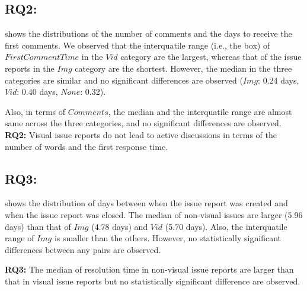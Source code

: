 \subsection*{RQ2: \RQtwo{}}


 shows the distributions of the number of comments and the days to receive the first comments. 
We observed that the interquatile range (i.e., the box) of $FirstCommentTime$ in the $Vid$ category are the largest, whereas that of the issue reports in the $Img$ category are the shortest. 
However, the median in the three categories are similar and no significant differences are observed ($Img$: 0.24 days, $Vid$: 0.40 days, $None$: 0.32). 

Also, in terms of $Comments$, the median and the interquatile range are almost same across the three categories, and no significant differences are observed. 
\vspace{-0.2cm}%
\summarybox
{{\bf RQ2: }{
    Visual issue reports do not lead to active discussions in terms of the number of words and the first response time. 
}}
\subsection*{RQ3: \RQthree{}}
 shows the distribution of days between when the issue report was created and when the issue report was closed. The median of non-visual issues are larger (5.96 days) than that of $Img$ (4.78 days) and $Vid$ (5.70 days). Also, the interquatile range of $Img$ is smaller than the others. However, no statistically significant differences between any pairs are observed.  

\vspace{-0.2cm}%
\summarybox
{{\bf RQ3: }{
The median of resolution time in non-visual issue reports are larger than that in visual issue reports but no statistically significant difference are observed. 
}}




